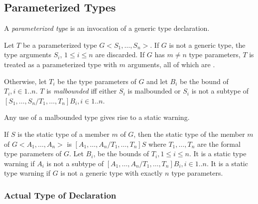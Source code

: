 \documentclass{article}
\begin{document}


\subsection{Parameterized Types}

\LMHash{}
A {\em parameterized type} is an invocation of a generic type declaration.

\LMHash{}
Let $T$ be a parameterized type $G<S_1, \ldots, S_n>$.
If $G$ is not a generic type, the type arguments $S_i$, $1 \le i \le n$ are discarded.
If $G$ has $m \ne n$ type parameters, $T$ is treated as a parameterized type with $m$ arguments, all of which are \DYNAMIC{}.


\LMHash{}
Otherwise, let $T_i$ be the type parameters of $G$ and let $B_i$ be the bound of $T_i, i \in 1 .. n$.
$T$ is {\em malbounded} if{}f either $S_i$ is malbounded or $S_i$ is not a subtype of $[S_1, \ldots, S_n/T_1, \ldots, T_n]B_i, i \in 1 .. n$.


\LMHash{}
Any use of a malbounded type gives rise to a static warning.

\LMHash{}
If $S$ is the static type of a member $m$ of $G$, then the static type of the member $m$ of $G<A_1, \ldots, A_n>$ is $[A_1, \ldots, A_n/T_1, \ldots, T_n]S$ where $T_1, \ldots, T_n$ are the formal type parameters of $G$.
Let $B_i$, be the bounds of $T_i, 1 \le i \le n$.
It is a static type warning if $A_i$ is not a subtype of $[A_1, \ldots, A_n/T_1, \ldots, T_n]B_i, i \in 1 .. n$.
It is a static type warning if $G$ is not a generic type with exactly $n$ type parameters.


\subsubsection{Actual Type of Declaration}
\end{document}

